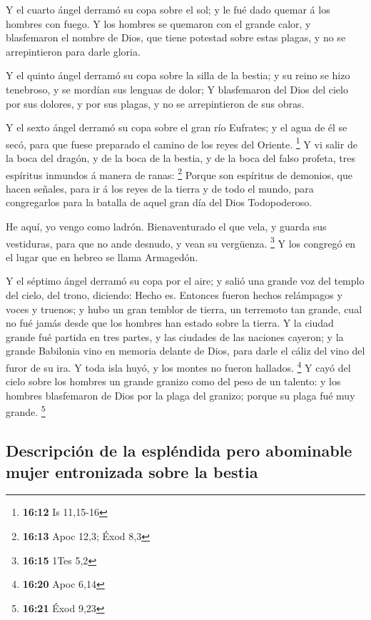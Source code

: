 Y el cuarto ángel derramó su copa sobre el sol; y le fué
dado quemar á los hombres con fuego.  Y los hombres se
quemaron con el grande calor, y blasfemaron el nombre de Dios, que tiene
potestad sobre estas plagas, y no se arrepintieron para darle gloria.

 Y el quinto ángel derramó su copa sobre la silla de la
bestia; y su reino se hizo tenebroso, y se mordían sus lenguas de dolor;
 Y blasfemaron del Dios del cielo por sus dolores, y por
sus plagas, y no se arrepintieron de sus obras.

 Y el sexto ángel derramó su copa sobre el gran río
Eufrates; y el agua de él se secó, para que fuese preparado el camino de
los reyes del Oriente. \footnote{\textbf{16:12} Is 11,15-16}
 Y vi salir de la boca del dragón, y de la boca de la
bestia, y de la boca del falso profeta, tres espíritus inmundos á manera
de ranas: \footnote{\textbf{16:13} Apoc 12,3; Éxod 8,3} 
Porque son espíritus de demonios, que hacen señales, para ir á los reyes
de la tierra y de todo el mundo, para congregarlos para la batalla de
aquel gran día del Dios Todopoderoso.

 He aquí, yo vengo como ladrón. Bienaventurado el que vela,
y guarda sus vestiduras, para que no ande desnudo, y vean su vergüenza.
\footnote{\textbf{16:15} 1Tes 5,2}  Y los congregó en el
lugar que en hebreo se llama Armagedón.

 Y el séptimo ángel derramó su copa por el aire; y salió
una grande voz del templo del cielo, del trono, diciendo: Hecho es.
 Entonces fueron hechos relámpagos y voces y truenos; y
hubo un gran temblor de tierra, un terremoto tan grande, cual no fué
jamás desde que los hombres han estado sobre la tierra.  Y
la ciudad grande fué partida en tres partes, y las ciudades de las
naciones cayeron; y la grande Babilonia vino en memoria delante de Dios,
para darle el cáliz del vino del furor de su ira.  Y toda
isla huyó, y los montes no fueron hallados. \footnote{\textbf{16:20}
  Apoc 6,14}  Y cayó del cielo sobre los hombres un grande
granizo como del peso de un talento: y los hombres blasfemaron de Dios
por la plaga del granizo; porque su plaga fué muy grande. \footnote{\textbf{16:21}
  Éxod 9,23}

\hypertarget{descripciuxf3n-de-la-espluxe9ndida-pero-abominable-mujer-entronizada-sobre-la-bestia}{%
\subsection{Descripción de la espléndida pero abominable mujer
entronizada sobre la
bestia}\label{descripciuxf3n-de-la-espluxe9ndida-pero-abominable-mujer-entronizada-sobre-la-bestia}}

